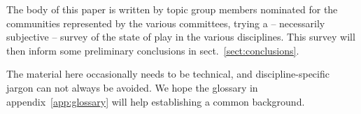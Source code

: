 \documentclass{article}
\begin{document}
The body of this paper is written by topic group members nominated for
the communities represented by the various committees, trying a --
necessarily subjective -- survey of the state of play in the various
disciplines.  This survey will then inform some preliminary conclusions
in sect.~\ref{sect:conclusions}.

The material here occasionally needs to be technical, and
discipline-specific jargon can not always be avoided.  We hope the
glossary in appendix~\ref{app:glossary} will help establishing a common
background.



















\appendix


\end{document}
